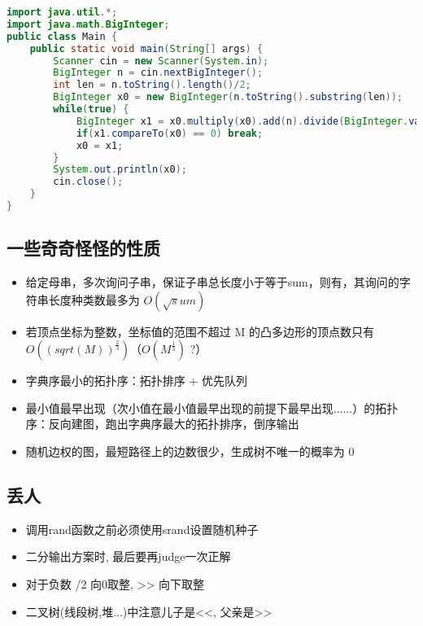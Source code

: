 \begin{lstlisting}[language=java]
import java.util.*;
import java.math.BigInteger;
public class Main {
    public static void main(String[] args) {
        Scanner cin = new Scanner(System.in);
        BigInteger n = cin.nextBigInteger();
        int len = n.toString().length()/2;
        BigInteger x0 = new BigInteger(n.toString().substring(len));
        while(true) {
            BigInteger x1 = x0.multiply(x0).add(n).divide(BigInteger.valueOf(2).multiply(x0));
            if(x1.compareTo(x0) == 0) break;
            x0 = x1;
        }
        System.out.println(x0);
        cin.close();
    }
}
\end{lstlisting}


\subsection{一些奇奇怪怪的性质}

\begin{itemize}
    \item 给定母串，多次询问子串，保证子串总长度小于等于sum，则有，其询问的字符串长度种类数最多为 $O(\sqrt sum)$
    \item 若顶点坐标为整数，坐标值的范围不超过 M 的凸多边形的顶点数只有 $O((sqrt(M))^\frac{2}{3}) （O(M^\frac{1}{3})$ ?）
    \item 字典序最小的拓扑序：拓扑排序 + 优先队列
    \item 最小值最早出现（次小值在最小值最早出现的前提下最早出现......）的拓扑序：反向建图，跑出字典序最大的拓扑排序，倒序输出
    \item 随机边权的图，最短路径上的边数很少，生成树不唯一的概率为 0
\end{itemize}

\subsection{丢人}

\begin{itemize}
    \item 调用rand函数之前必须使用srand设置随机种子
    \item 二分输出方案时, 最后要再judge一次正解
    \item 对于负数 /2 向0取整, >> 向下取整
    \item 二叉树(线段树,堆...)中注意儿子是<<, 父亲是>>
\end{itemize}